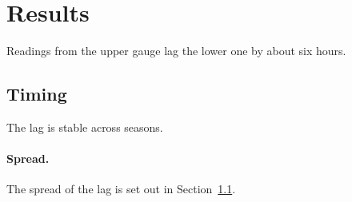 \documentclass{article}
\begin{document}
\section{Results}
Readings from the upper gauge lag the lower one by about six hours.
\subsection{Timing}\label{sec:timing}
The lag is stable across seasons.
\paragraph{Spread.}
The spread of the lag is set out in Section~\ref{sec:timing}.
\end{document}
